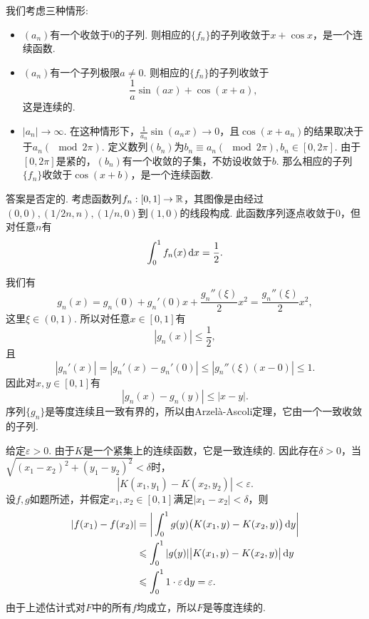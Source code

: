 \begin{ans}
  我们考虑三种情形:
  \begin{itemize}
    \item $(a_n)$有一个收敛于0的子列. 则相应的$\{f_n\}$的子列收敛于$x+\cos x$，是一个连续函数.
    \item $(a_n)$有一个子列极限$a\ne0$. 则相应的$\{f_n\}$的子列收敛于
        \[ \frac1a\sin(ax)+\cos(x+a), \]
        这是连续的.
    \item $|a_n|\to\infty$. 在这种情形下，$\frac1{a_n}\sin(a_n x)\to 0$，且$\cos(x+a_n)$的结果取决于于$a_n(\mod2\pi)$. 定义数列$(b_n)$为$b_n\equiv a_n(\mod2\pi),b_n\in[0,2\pi]$. 由于$[0,2\pi]$是紧的，$(b_n)$有一个收敛的子集，不妨设收敛于$b$. 那么相应的子列$\{f_n\}$收敛于$\cos(x+b)$，是一个连续函数.
  \end{itemize}
\end{ans}

\begin{ans}
  答案是否定的. 考虑函数列$f_n:[0,1]\to\mathbb R$，其图像是由经过$(0,0),(1/2n,n),(1/n,0)$到$(1,0)$的线段构成. 此函数序列逐点收敛于0，但对任意$n$有
  \[ \int_0^1f_n(x)\,\mathrm dx=\frac12. \]
  \begin{figure}[!ht]
    \centering
  \end{figure}
\end{ans}

\begin{ans}
  我们有
  \[
    g_n(x)=g_n(0)+g_n'(0)x+\frac{g_n''(\xi)}2x^2
    = \frac{g_n''(\xi)}2x^2,
  \]
  这里$\xi\in(0,1)$. 所以对任意$x\in[0,1]$有
  \[ |g_n(x)|\le\frac12, \]
  且
  \[
    |g_n'(x)|=|g_n'(x)-g_n'(0)|\le
    |g_n''(\xi)(x-0)|\le1.
  \]
  因此对$x,y\in[0,1]$有
  \[ |g_n(x)-g_n(y)|\le|x-y|. \]
  序列$\{g_n\}$是等度连续且一致有界的，所以由Arzel\`a-Ascoli定理，它由一个一致收敛的子列.
\end{ans}

\begin{ans}
  给定$\varepsilon>0$. 由于$K$是一个紧集上的连续函数，它是一致连续的. 因此存在$\delta>0$，当$\sqrt{(x_1-x_2)^2+(y_1-y_2)^2}<\delta$时，
  \[ |K(x_1,y_1)-K(x_2,y_2)|<\varepsilon. \]
  设$f,g$如题所述，并假定$x_1,x_2\in[0,1]$满足$|x_1-x_2|<\delta$，则
  \begin{align*}
    |f(x_1)-f(x_2)| & = \bigg| \int_0^1g(y)
    \big(K(x_1,y)-K(x_2,y)\big)\,\mathrm dy \bigg|\\
    & \leqslant \int_0^1|g(y)|\big| K(x_1,y)-K(x_2,y) \big|\,\mathrm dy\\
    & \leqslant \int_0^11\cdot\varepsilon\,\mathrm dy = \varepsilon.
  \end{align*}
  由于上述估计式对$F$中的所有$f$均成立，所以$F$是等度连续的.
\end{ans}


